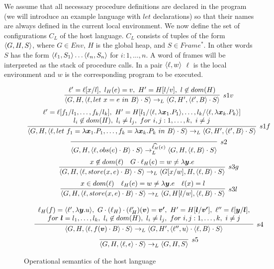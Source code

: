 We assume that all necessary procedure definitions are declared in the program (we will introduce an example language  with $let$ declarations) so that their names are always defined in the current local environment.
We now define the set of configurations $C_L$ of the host language.
$C_L$ consists of tuples of the form  $\langle G,H,S \rangle$, where $G\in Env$, $H$ is the global heap, and $S\in Frame^*$. 
In other words $S$ has the form $\langle \ell_1,S_1 \rangle\ldots\langle \ell_n,S_n \rangle$ for $i:1,\ldots,n$.
A word of frames will be interpreted as the stack of procedure calls.
In a pair $\langle \ell,w \rangle$  $\ell$ is the local environment and $w$ is the corresponding program to be executed. 
\begin{figure}[h]
{\footnotesize 
$$
\begin{array}{c}
\infer[s1v]
{\tuple{G,H,\tuple{\ell,let\ x=e\ in\ B}\cdot S}\rightarrow_L
 \tuple{G,H',\tuple{\ell',B}\cdot S}}
{
\ell'=\ell[x/l],\ l_H(e)=v,\ H'=H[l/v],\ l\not\in dom(H)
}
\medskip\\
\infer[s1f]
{\tuple{G,H,\tuple{\ell,let\ f_1=\lambda\vec{x}_1.P_1,\ldots,f_k=\lambda\vec{x}_k.P_k\ in\ B}\cdot S}\rightarrow_L
 \tuple{G,H',\tuple{\ell',B}\cdot S}}
{
\begin{array}{c}
\ell'=\ell[f_1/l_1,\ldots,f_k/l_k],\
 H'=H[l_1/\tuple{\ell,\lambda\vec{x}_1.P_1},\ldots,l_k/\tuple{\ell,\lambda\vec{x}_k.P_k}]\\
 l_i\not\in dom(H),\ l_i\neq l_j,\  for\ i,j:1,\ldots,k,\ i\neq j
\end{array}
}
\medskip\\
\infer[s2]{
\tuple{G,H,\tuple{\ell,obs(e)\cdot B}\cdot S}\rightarrow_L^{\widehat{\ell_H}(e)}
\tuple{G,H,\tuple{\ell,B}\cdot S}}{}
\medskip\\
\infer[s3g]{
\tuple{G,H,\tuple{\ell,store(x,e)\cdot B}\cdot S}\rightarrow_L
\tuple{G[x/w],H,\tuple{\ell,B}\cdot S}}
 {x\not\in dom(\ell) & G\cdot \ell_H(e)=w\neq\lambda\vec{y}.e}
\medskip\\
\infer[s3l]{
\tuple{G,H,\tuple{\ell,store(x,e)\cdot B}\cdot S}\rightarrow_L
\tuple{G,H[l/w],\tuple{\ell,B}\cdot S}}
 {x\in dom(\ell) & \ell_H(e)=w\neq\lambda\vec{y}.e & \ell(x)=l}
\\ 
\\
\infer[s4]{
\tuple{G,H,\tuple{\ell,f(\vec{v})\cdot B}\cdot S}\rightarrow_L
\tuple{G,H',\tuple{\ell'',u}\cdot \tuple{\ell,B}\cdot S}}
{
\begin{array}{c}
\ell_H(f)=\tuple{\ell',\lambda\vec{y}.u},\ G\cdot (\ell_H)\cdot(\ell'_H)(\vec{v})=\vec{v'},\ 
H'=H[\vec{l}/\vec{v'}],\ \ell''=\ell[\vec{y}/\vec{l}],\\ 
for\ \vec{l}=l_1,\ldots,l_k,\ 
l_i\not\in dom(H),\ l_i\neq l_j,\  for\ i,j:1,\ldots,k,\ i\neq j
\end{array}
}
\medskip\\
\infer[s5]{
\tuple{G,H,\tuple{\ell,\epsilon}\cdot S}\rightarrow_L
\tuple{G,H,S}}{}
\end{array}
$$
}
\caption{Operational semantics of the host language}
\label{fig:opseml}
\end{figure}
%
